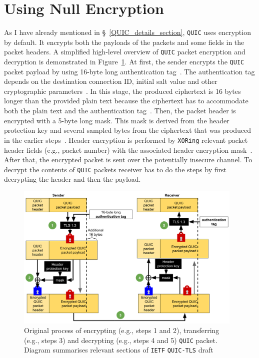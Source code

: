\documentclass[12pt,a4paper,twoside,openright]{report}
\begin{document}
\section{Using Null Encryption}

As I have already mentioned in \S~\ref{QUIC_details_section}, \texttt{QUIC} uses encryption by default.
It encrypts both the payloads of the packets and some fields in the packet headers.
A simplified high-level overview of \texttt{QUIC} packet encryption and decryption is demonstrated in Figure~\ref{fig:Cryptographic_procedures_of_quic}.
At first, the sender encrypts the \texttt{QUIC} packet payload by using 16-byte long authentication tag~\cite[Section 5]{ietf-quic-tls-32}. 
The authentication tag depends on the destination connection ID, initial salt value and other cryptographic parameters~\cite[Section 5]{ietf-quic-tls-32}.
In this stage, the produced ciphertext is 16 bytes longer than the provided plain text because the ciphertext has to accommodate both the plain text and the authentication tag~\cite[Section 5.3]{ietf-quic-tls-32}.
Then, the packet header is encrypted with a 5-byte long mask.
This mask is derived from the header protection key and several sampled bytes from the ciphertext that was produced in the earlier steps~\cite[Section 5]{ietf-quic-tls-32}. 
Header encryption is performed by \texttt{XORing} relevant packet header fields (e.g., packet number) with the associated header encryption mask~\cite[Section 5]{ietf-quic-tls-32}.
After that, the encrypted packet is sent over the potentially insecure channel.
To decrypt the contents of \texttt{QUIC} packets receiver has to do the steps by first decrypting the header and then the payload.

    \begin{figure}[H]
    \centering
    \includegraphics[width=0.97\textwidth]{figs/Cryptographic_procedures_of_quic.png}
    \caption[Original process of encrypting, transferring and decrypting \texttt{QUIC} packet]{Original process of encrypting (e.g., steps 1 and 2), transferring  (e.g., steps 3) and decrypting (e.g., steps 4 and 5) \texttt{QUIC} packet. Diagram summarises relevant sections of \texttt{IETF} \texttt{QUIC-TLS} draft~\cite[Section 5]{ietf-quic-tls-32}}
    \label{fig:Cryptographic_procedures_of_quic}
    \end{figure}
\end{document}
